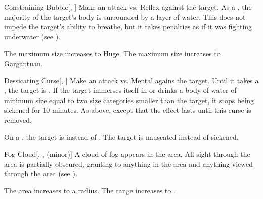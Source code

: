 \lowercase{\hypertarget{spell:Constraining Bubble}{}}\label{spell:Constraining Bubble}
\begin{freeability}[Rank 3]{\hypertarget{spell:Constraining Bubble}{Constraining Bubble}}[, ]
Make an attack vs. Reflex against the target.
\hit As a , the majority of the target's body is surrounded by a layer of water.
This does not impede the target's ability to breathe, but it takes penalties as if it was fighting underwater (see ).

\rankline
{} The maximum size increases to Huge.
 The maximum size increases to Gargantuan.
\end{freeability}
\vspace{0.25em}



\lowercase{\hypertarget{spell:Dessicating Curse}{}}\label{spell:Dessicating Curse}
\begin{freeability}[Rank 3]{\hypertarget{spell:Dessicating Curse}{Dessicating Curse}}[, ]
Make an attack vs. Mental agains the target.
\hit Until it takes a , the target is .
If the target immerses itself in or drinks a body of water of minimum size equal to two size categories smaller than the target,
it stops being sickened for 10 minutes.
\crit As above, except that the effect lasts until this curse is removed.

\rankline
{} On a , the target is  instead of .
 The target is nauseated instead of sickened.
\end{freeability}
\vspace{0.25em}



\lowercase{\hypertarget{spell:Fog Cloud}{}}\label{spell:Fog Cloud}
\begin{freeability}[Rank 3]{\hypertarget{spell:Fog Cloud}{Fog Cloud}}[, ,  (minor)]
A cloud of fog appears in the area.
All sight through the area is partially obscured, granting  to anything in the area and anything viewed through the area (see ).

\rankline
{} The area increases to a \arealarge radius.
 The range increases to \rnglong.
\end{freeability}
\vspace{0.25em}



